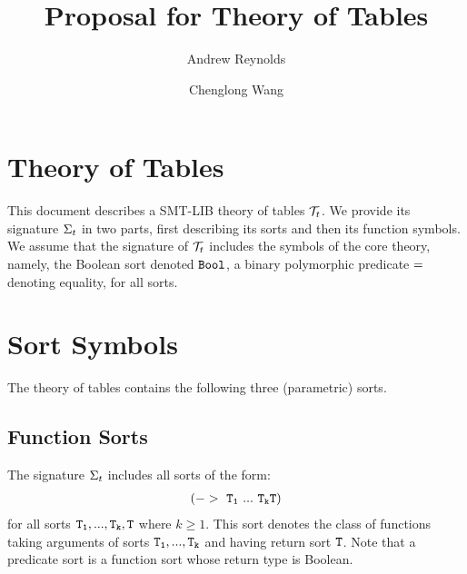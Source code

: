 \documentclass[english,a4paper,10pt]{article}
\begin{document}
\title{Proposal for Theory of Tables}

\author{Andrew Reynolds \and Chenglong Wang}

\maketitle



\section{Theory of Tables}

This document describes a SMT-LIB theory of tables $\mathcal{T}_{t}$.
We provide its signature $\Sigma_{t}$ in two parts,
first describing its sorts and then its function symbols.
We assume that the signature of $\mathcal{T}_{t}$ includes the symbols of the core theory, 
namely, the Boolean sort denoted ${\tt Bool}$,
a binary polymorphic predicate ${\tt =}$ denoting equality, for all sorts.

\section{Sort Symbols}

The theory of tables contains the following three (parametric) sorts.

\subsection{Function Sorts}
The signature $\Sigma_{t}$ includes all sorts of the form:
\begin{align*}
{\tt (->\ T_1\ ...\ T_k T)}
\end{align*}
for all sorts ${\tt T_1, ..., T_k, T}$ where $k \geq 1$.
This sort denotes the class of functions taking arguments of sorts ${\tt T_1, ..., T_k}$
and having return sort ${\tt T}$.
Note that a predicate sort is a function sort whose return
type is Boolean.

\begin{comment}
\paragraph{Notes}
\begin{itemize}
\item The term $\syntax{ 
(lambda\ ((x_1\ T_1)\ ...\ (x_n\ T_n))\ t)
}$
has sort 
$\syntax{(->\ T_1\ ...\ T_n\ T)}$
when $\syntax{t}$ has sort $\syntax{T}$.
\end{itemize}
\end{comment}
\end{document}
